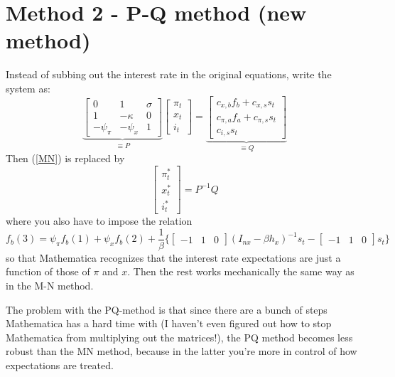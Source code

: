 \documentclass[11pt]{article}
\renewcommand{\[}{\begin{equation}}
\renewcommand{\]}{\end{equation}}
\begin{document}
\section{Method 2 - P-Q method (new method)}
Instead of subbing out the interest rate in the original equations, write the system as:
\begin{equation}
\underbrace{\begin{bmatrix} 0& 1&  \sigma \\ 1& -\kappa & 0 \\ -\psi_{\pi} & -\psi_{x} & 1 \end{bmatrix}}_{\equiv P}\begin{bmatrix} \pi_t \\ x_t \\i_t \end{bmatrix} = \underbrace{\begin{bmatrix} c_{x,b}f_b +c_{x,s} s_t \\ c_{\pi,a}f_a +c_{\pi,s} s_t \\ c_{i,s} s_t \end{bmatrix}}_{\equiv Q}
\end{equation}
Then (\ref{MN}) is replaced by 
\begin{equation}
\begin{bmatrix} \pi_t^* \\ x_t^* \\ i_t^* \end{bmatrix} = P^{-1}Q \label{PQ}
\end{equation}
where you also have to impose the relation
\begin{equation}
f_b(3) = \psi_{\pi}f_b(1) + \psi_{x}f_b(2) + \frac{1}{\beta}\{ \begin{bmatrix} -1 &1 & 0  \end{bmatrix}(I_{nx}-\beta h_x)^{-1} s_t - \begin{bmatrix} -1 &1 & 0  \end{bmatrix}s_t  \} \tag{*}
\end{equation}
so that Mathematica recognizes that the interest rate expectations are just a function of those of $\pi$ and $x$. Then the rest works mechanically the same way as in the M-N method. 

The problem with the PQ-method is that since there are a bunch of steps Mathematica has a hard time with (I haven't even figured out how to stop Mathematica from multiplying out the matrices!), the PQ method becomes less robust than the MN method, because in the latter you're more in control of how expectations are treated.
\end{document}
